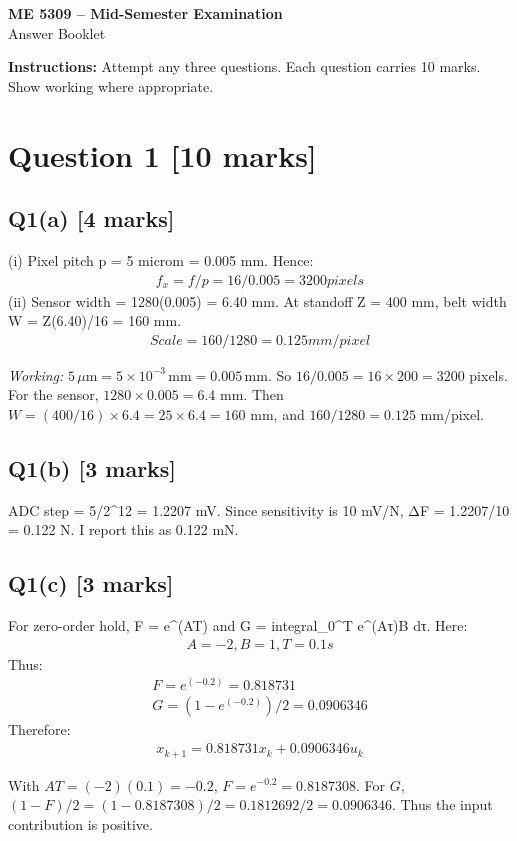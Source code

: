 \documentclass[11pt,a4paper]{article}
\begin{document}
\begin{center}
{\Large\bfseries ME 5309 -- Mid-Semester Examination}\\[3pt]
{\large Answer Booklet}\\[8pt]
\end{center}
\textbf{Instructions:} Attempt any three questions. Each question carries 10 marks. Show working where appropriate.
\section*{Question 1 \hfill [10 marks]}
\subsection*{Q1(a) \hfill [4 marks]}

(i) Pixel pitch p = 5 microm = 0.005 mm.
Hence:\[\begin{aligned}f_x = f/p = 16/0.005 = 3200 pixels\end{aligned}\]
(ii) Sensor width = 1280(0.005) = 6.40 mm.
At standoff Z = 400 mm, belt width W = Z(6.40)/16 = 160 mm.
\[\begin{aligned}Scale = 160/1280 = 0.125 mm/pixel\end{aligned}\]\par\smallskip\textit{Working:} $5\,\mu\mathrm{m}=5\times10^{-3}\,\mathrm{mm}=0.005\,\mathrm{mm}$. So $16/0.005=16\times200=3200$ pixels. For the sensor, $1280\times0.005=6.4$ mm. Then $W=(400/16)\times6.4=25\times6.4=160$ mm, and $160/1280=0.125$ mm/pixel.

\subsection*{Q1(b) \hfill [3 marks]}

ADC step = 5/2\textasciicircum{}12 = 1.2207 mV.
Since sensitivity is 10 mV/N, ΔF = 1.2207/10 = 0.122 N.
I report this as 0.122 mN.

\subsection*{Q1(c) \hfill [3 marks]}

For zero-order hold, F = e\textasciicircum{}(AT) and G = integral\_0\textasciicircum{}T e\textasciicircum{}(Aτ)B dτ.
Here:\[\begin{aligned}A = -2, B = 1, T = 0.1 s\end{aligned}\]
Thus:\[\begin{aligned}F = e^(-0.2) = 0.818731\\ G = (1-e^(-0.2))/2 = 0.0906346\end{aligned}\]
Therefore:\[\begin{aligned}x_{k+1} = 0.818731 x_k + 0.0906346 u_k\end{aligned}\]\par\smallskip With $AT=(-2)(0.1)=-0.2$, $F=e^{-0.2}=0.8187308$. For $G$, $(1-F)/2=(1-0.8187308)/2=0.1812692/2=0.0906346$. Thus the input contribution is positive.
\end{document}
